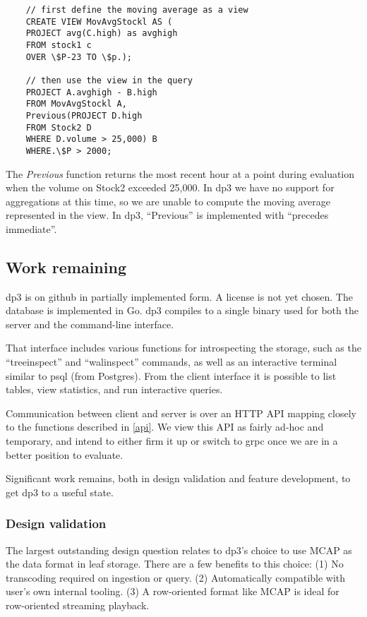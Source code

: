 \documentclass[9pt,twocolumn]{article}
\newcommand{\q}[1]{``#1''}
\begin{document}
    \begin{lstlisting}
    // first define the moving average as a view
    CREATE VIEW MovAvgStockl AS (
    PROJECT avg(C.high) as avghigh
    FROM stock1 c
    OVER \$P-23 TO \$p.);

    // then use the view in the query
    PROJECT A.avghigh - B.high
    FROM MovAvgStockl A,
    Previous(PROJECT D.high
    FROM Stock2 D
    WHERE D.volume > 25,000) B
    WHERE.\$P > 2000;
    \end{lstlisting}

    The \textit{Previous} function returns the most recent hour at a point during
    evaluation when the volume on Stock2 exceeded 25,000. In dp3 we have no support
    for aggregations at this time, so we are unable to compute the moving average
    represented in the view. In dp3, \q{Previous} is implemented with \q{precedes
    immediate}.

    \subsection{Work remaining}
    dp3 is on github \cite{dp3} in partially implemented form. A license is not
    yet chosen. The database is implemented in Go. dp3 compiles to a single
    binary used for both the server and the command-line interface.

    That interface includes various functions for introspecting the storage,
    such as the \q{treeinspect} and \q{walinspect} commands, as well as an
    interactive terminal similar to psql (from Postgres). From the client
    interface it is possible to list tables, view statistics, and run
    interactive queries.

    Communication between client and server is over an HTTP API mapping closely
    to the functions described in \ref{api}. We view this API as fairly ad-hoc
    and temporary, and intend to either firm it up or switch to grpc once we
    are in a better position to evaluate.

    Significant work remains, both in design validation and feature
    development, to get dp3 to a useful state.


    \subsubsection{Design validation}
    The largest outstanding design question relates to dp3’s choice to use MCAP
    as the data format in leaf storage. There are a few benefits to this
    choice: (1) No transcoding required on ingestion or query. (2)
    Automatically compatible with user’s own internal tooling. (3) A
    row-oriented format like MCAP is ideal for row-oriented streaming playback.
\end{document}
